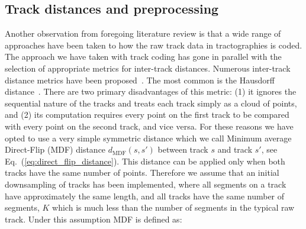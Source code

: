 \documentclass[preprint,authoryear,a4paper,10pt,onecolumn]{elsarticle}
\begin{document}








\subsection{\label{sub:track-distances}Track distances and preprocessing}

Another observation from foregoing literature review is that a wide
range of approaches have been taken to how the raw track data in
tractographies is coded. The approach we have taken with track coding
has gone in parallel with the selection of appropriate metrics for
inter-track distances.  Numerous inter-track distance metrics have been
proposed~\citep{Ding2003, MaddahIPMI2007, zhang2005dti}. The most common
is the Hausdorff distance~\citep[and many other
studies]{corouge2004towards}. There are two primary disadvantages of
this metric: (1) it ignores the sequential nature of the tracks and
treats each track simply as a cloud of points, and (2) its computation
requires every point on the first track to be compared with every point
on the second track, and vice versa. For these reasons we have opted to
use a very simple symmetric distance \citep{EGMB10, Visser2010} which we
call Minimum average Direct-Flip (MDF) distance
$d_{\textrm{MDF}}(s,s')$ between track $s$ and track $s'$,
see Eq.~(\ref{eq:direct_flip_distance}). This distance can be applied
only when both tracks have the same number of points. Therefore we
assume that an initial downsampling of tracks has been implemented,
where all segments on a track have approximately the same length, and
all tracks have the same number of segments, $K$ which is much less than
the number of segments in the typical raw track. Under this assumption
MDF is defined as:
\end{document}
